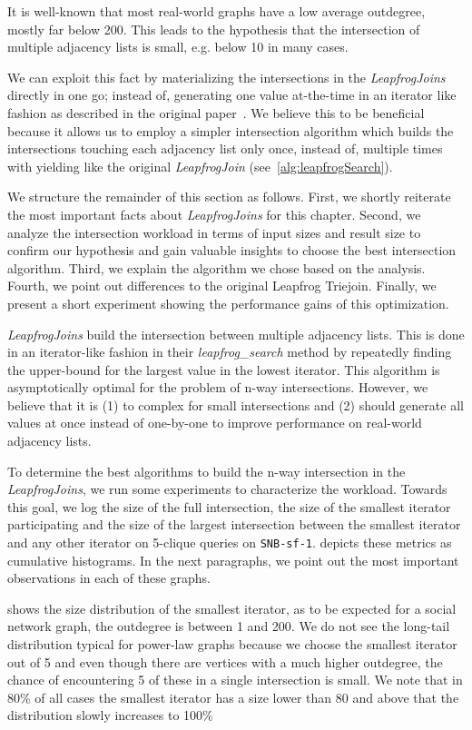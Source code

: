 It is well-known that most real-world graphs have a low average outdegree, mostly far below 200.
This leads to the hypothesis that the intersection of multiple adjacency lists is small, e.g. below 10 in many cases.

We can exploit this fact by materializing the intersections in the \textit{LeapfrogJoins} directly
in one go; instead of, generating one value at-the-time in an iterator like fashion as described in the
original paper~\cite{lftj}.
We believe this to be beneficial because it allows us to employ a simpler intersection algorithm which builds
the intersections touching each adjacency list only once, instead of, multiple times with yielding like the original
\textit{LeapfrogJoin} (see~\cref{alg:leapfrogSearch}).

We structure the remainder of this section as follows.
First, we shortly reiterate the most important facts about \textit{LeapfrogJoins} for this chapter.
Second, we analyze the intersection workload in terms of input sizes and result size to confirm our hypothesis
and gain valuable insights to choose the best intersection algorithm.
Third, we explain the algorithm we chose based on the analysis.
Fourth, we point out differences to the original Leapfrog Triejoin.
Finally, we present a short experiment showing the performance gains of this optimization.

\textit{LeapfrogJoins} build the intersection between multiple adjacency lists.
This is done in an iterator-like fashion in their \textit{leapfrog\_search} method by repeatedly finding the upper-bound for the largest
value in the lowest iterator.
This algorithm is asymptotically optimal for the problem of n-way intersections.
However, we believe that it is (1) to complex for small intersections and (2) should generate all values at once instead of one-by-one to
improve performance on real-world adjacency lists.

To determine the best algorithms to build the n-way intersection in the \textit{LeapfrogJoins},
we run some experiments to characterize the workload.
Towards this goal, we log the size of the full intersection, the size of the smallest iterator participating
and the size of the largest intersection between the smallest iterator and any other iterator on 5-clique queries on \texttt{SNB-sf-1}.
 depicts these metrics as cumulative histograms.
In the next paragraphs, we point out the most important observations in each of these graphs.

 shows the size distribution of the smallest iterator, as to be expected for a social network
graph, the outdegree is between 1 and 200.
We do not see the long-tail distribution typical for power-law graphs because we choose the smallest iterator out of 5 and even
though there are vertices with a much higher outdegree, the chance of encountering 5 of these in a single intersection is small.
We note that in 80\% of all cases the smallest iterator has a size lower than 80 and above that the distribution slowly increases to 100\%


